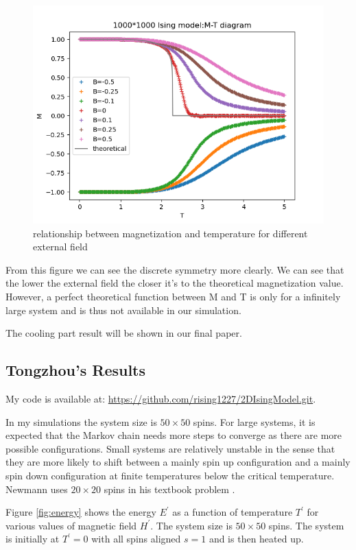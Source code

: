\documentclass[11pt]{article}
\begin{document}
\begin{figure}[H]
    \centering
    \includegraphics[scale = 0.7]{Figs_XYL/M-T_withB_diagram(latest).png}
    \caption{relationship between magnetization and temperature for different external field}
    \label{ETXinyu}
\end{figure}

From this figure we can see the discrete symmetry more clearly. We can see that the lower the external field the closer it's to the theoretical magnetization value. However, a perfect theoretical function between M and T is only for a infinitely large system and is thus not available in our simulation.

The cooling part result will be shown in our final paper.

\subsection{Tongzhou's Results}
My code is available at: \url{https://github.com/rising1227/2DIsingModel.git}.

In my simulations the system size is $50 \times 50$ spins. For large systems, it is expected that the Markov chain needs more steps to converge as there are more possible configurations. Small systems are relatively unstable in the sense that they are more likely to shift between a mainly spin up configuration and a mainly spin down configuration at finite temperatures below the critical temperature. Newmann uses $20 \times 20$ spins in his textbook problem \cite{newman2013computational}.

Figure \ref{fig:energy} shows the energy $E^\prime$ as a function of temperature $T^\prime$ for various values of magnetic field $H^\prime$. The system size is $50 \times 50$ spins. The system is initially at $T^\prime = 0$ with all spins aligned $s=1$ and is then heated up.
\end{document}
